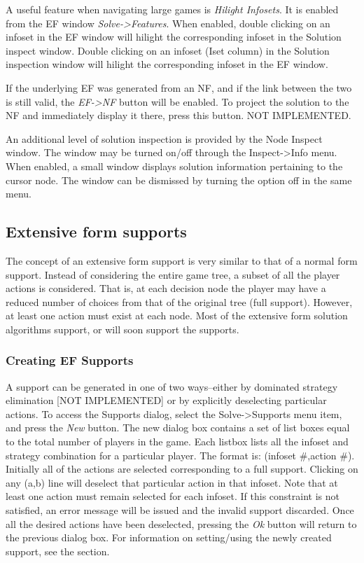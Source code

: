 A useful feature when navigating large games is {\em Hilight Infosets}.  It is enabled
from the EF window {\em Solve->Features}.  When enabled, double clicking on an
infoset in the EF window will hilight the corresponding infoset in the Solution inspect
window.  Double clicking on an infoset (Iset column) in the Solution inspection window
will hilight the corresponding infoset in the EF window.

If the underlying EF was generated from an NF, and if the link between the two is still
valid, the {\em EF->NF} button will be enabled.  To project the solution to the NF and
immediately display it there, press this button.  NOT IMPLEMENTED.
 
An additional level of solution inspection is provided by the Node Inspect
window.  The window may be turned on/off through the Inspect->Info menu. When
enabled, a small window displays solution information pertaining to the cursor
node.  The window can be dismissed by turning the option off in the same menu.

\subsection{Extensive form supports}
The concept of an extensive form support is very similar to that of a normal form support.
Instead of considering the entire game tree, a subset of all the player actions is considered.
That is, at each decision node the player may have a reduced number of choices from that of
the original tree (full support).  However, at least one action must exist at each node.  Most 
of the extensive form solution algorithms support, or will soon support the supports.

\subsubsection{Creating EF Supports}
A support can be generated in one of two ways--either by dominated strategy elimination
[NOT IMPLEMENTED] or by explicitly deselecting particular actions.  To access the 
Supports dialog, select the Solve->Supports menu item, and press the {\em New} button.
The new dialog box contains a set of list boxes equal to the total number of players in the
game.  Each listbox lists all the infoset and strategy combination for a particular player.
The format is: (infoset #,action #).  Initially all of the actions are selected corresponding
to a full support.  Clicking on any (a,b) line will deselect that particular action in that
infoset.  Note that at least one action must remain selected for each infoset.  If this 
constraint is not satisfied, an error message will be issued and the invalid support discarded.
Once all the desired actions have been deselected, pressing the {\em Ok} button will return
to the previous dialog box.  For information on setting/using the newly created support, see
the  section.

